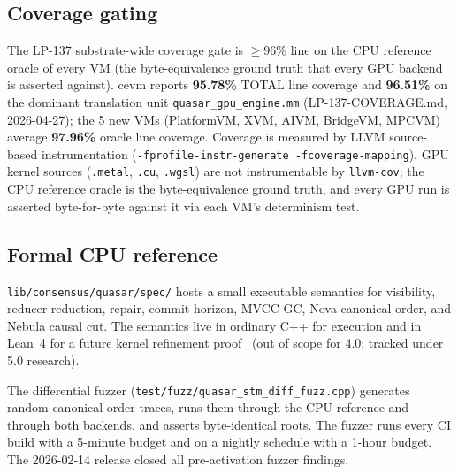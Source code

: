 \subsection{Coverage gating}\label{sec:determinism-coverage}

The LP-137 substrate-wide coverage gate is $\geq 96\%$ line on the
CPU reference oracle of every VM (the byte-equivalence ground truth
that every GPU backend is asserted against). cevm reports
\textbf{95.78\%} TOTAL line coverage and \textbf{96.51\%} on the
dominant translation unit \texttt{quasar\_gpu\_engine.mm} (LP-137-COVERAGE.md,
2026-04-27); the 5 new VMs (PlatformVM, XVM, AIVM, BridgeVM, MPCVM)
average \textbf{97.96\%} oracle line coverage. Coverage is measured
by LLVM source-based instrumentation
(\texttt{-fprofile-instr-generate -fcoverage-mapping}). GPU kernel
sources (\texttt{.metal}, \texttt{.cu}, \texttt{.wgsl}) are not
instrumentable by \texttt{llvm-cov}; the CPU reference oracle is the
byte-equivalence ground truth, and every GPU run is asserted
byte-for-byte against it via each VM's determinism test.

\subsection{Formal CPU reference}

\texttt{lib/consensus/quasar/spec/} hosts a small executable semantics
for visibility, reducer reduction, repair, commit horizon, MVCC GC,
Nova canonical order, and Nebula causal cut. The semantics live in
ordinary C++ for execution and in Lean~4 for a future kernel
refinement proof~\cite{vmvcc} (out of scope for 4.0; tracked under
5.0 research).

The differential fuzzer
(\texttt{test/fuzz/quasar\_stm\_diff\_fuzz.cpp}) generates random
canonical-order traces, runs them through the CPU reference and
through both backends, and asserts byte-identical roots. The fuzzer
runs every CI build with a 5-minute budget and on a nightly schedule
with a 1-hour budget. The 2026-02-14 release closed all pre-activation
fuzzer findings.

